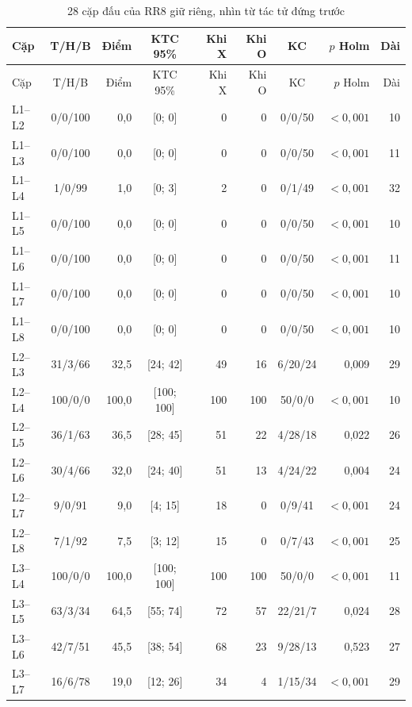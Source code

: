 \par{\footnotesize
\renewcommand{\arraystretch}{0.95}
\begin{longtable}{lcrcrrcrr}
  \caption{28 cặp đấu của RR8 giữ riêng, nhìn từ tác tử đứng trước}\label{tab:cs-tk-capdau}\\
    \toprule
    Cặp & T/H/B & Điểm & KTC 95\% & Khi X & Khi O & KC & $p$ Holm & Dài \\
    \midrule
  \endfirsthead
    \toprule
    Cặp & T/H/B & Điểm & KTC 95\% & Khi X & Khi O & KC & $p$ Holm & Dài \\
    \midrule
  \endhead
    \bottomrule
  \endfoot
    L1--L2 & 0/0/100 & 0,0 & [0; 0] & 0 & 0 & 0/0/50 & $<0{,}001$ & 10 \\
    L1--L3 & 0/0/100 & 0,0 & [0; 0] & 0 & 0 & 0/0/50 & $<0{,}001$ & 11 \\
    L1--L4 & 1/0/99 & 1,0 & [0; 3] & 2 & 0 & 0/1/49 & $<0{,}001$ & 32 \\
    L1--L5 & 0/0/100 & 0,0 & [0; 0] & 0 & 0 & 0/0/50 & $<0{,}001$ & 10 \\
    L1--L6 & 0/0/100 & 0,0 & [0; 0] & 0 & 0 & 0/0/50 & $<0{,}001$ & 11 \\
    L1--L7 & 0/0/100 & 0,0 & [0; 0] & 0 & 0 & 0/0/50 & $<0{,}001$ & 10 \\
    L1--L8 & 0/0/100 & 0,0 & [0; 0] & 0 & 0 & 0/0/50 & $<0{,}001$ & 10 \\
    L2--L3 & 31/3/66 & 32,5 & [24; 42] & 49 & 16 & 6/20/24 & 0,009 & 29 \\
    L2--L4 & 100/0/0 & 100,0 & [100; 100] & 100 & 100 & 50/0/0 & $<0{,}001$ & 10 \\
    L2--L5 & 36/1/63 & 36,5 & [28; 45] & 51 & 22 & 4/28/18 & 0,022 & 26 \\
    L2--L6 & 30/4/66 & 32,0 & [24; 40] & 51 & 13 & 4/24/22 & 0,004 & 24 \\
    L2--L7 & 9/0/91 & 9,0 & [4; 15] & 18 & 0 & 0/9/41 & $<0{,}001$ & 24 \\
    L2--L8 & 7/1/92 & 7,5 & [3; 12] & 15 & 0 & 0/7/43 & $<0{,}001$ & 25 \\
    L3--L4 & 100/0/0 & 100,0 & [100; 100] & 100 & 100 & 50/0/0 & $<0{,}001$ & 11 \\
    L3--L5 & 63/3/34 & 64,5 & [55; 74] & 72 & 57 & 22/21/7 & 0,024 & 28 \\
    L3--L6 & 42/7/51 & 45,5 & [38; 54] & 68 & 23 & 9/28/13 & 0,523 & 27 \\
    L3--L7 & 16/6/78 & 19,0 & [12; 26] & 34 & 4 & 1/15/34 & $<0{,}001$ & 29 \\

\end{longtable}}
